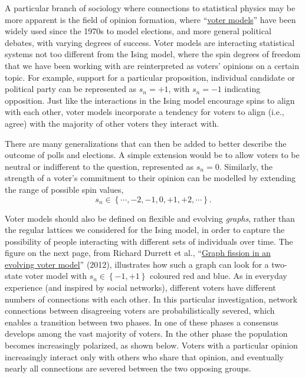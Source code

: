 A particular branch of sociology where connections to statistical physics may be more apparent is the field of opinion formation, where ``\href{https://en.wikipedia.org/wiki/Voter_model}{voter models}'' have been widely used since the 1970s to model elections, and more general political debates, with varying degrees of success.
Voter models are interacting statistical systems not too different from the Ising model, where the spin degrees of freedom that we have been working with are reinterpreted as voters' opinions on a certain topic.
For example, support for a particular proposition, individual candidate or political party can be represented as $s_n = +1$, with $s_n = -1$ indicating opposition.
Just like the interactions in the Ising model encourage spins to align with each other, voter models incorporate a tendency for voters to align (i.e., agree) with the majority of other voters they interact with.

There are many generalizations that can then be added to better describe the outcome of polls and elections.
A simple extension would be to allow voters to be neutral or indifferent to the question, represented as $s_n = 0$.
Similarly, the strength of a voter's commitment to their opinion can be modelled by extending the range of possible spin values,
\begin{equation*}
  s_n \in \left\{\cdots, -2, -1, 0, +1, +2, \cdots\right\}.
\end{equation*}

Voter models should also be defined on flexible and evolving \textit{graphs}, rather than the regular lattices we considered for the Ising model, in order to capture the possibility of people interacting with different sets of individuals over time.
The figure on the next page, from Richard Durrett et al., ``\href{https://doi.org/10.1073/pnas.1200709109}{Graph fission in an evolving voter model}'' (2012), illustrates how such a graph can look for a two-state voter model with $s_n \in \left\{-1, +1\right\}$ coloured red and blue.
As in everyday experience (and inspired by social networks), different voters have different numbers of connections with each other.
In this particular investigation, network connections between disagreeing voters are probabilistically severed, which enables a transition between two phases.
In one of these phases a consensus develops among the vast majority of voters.
In the other phase the population becomes increasingly polarized, as shown below.
Voters with a particular opinion increasingly interact only with others who share that opinion, and eventually nearly all connections are severed between the two opposing groups.

